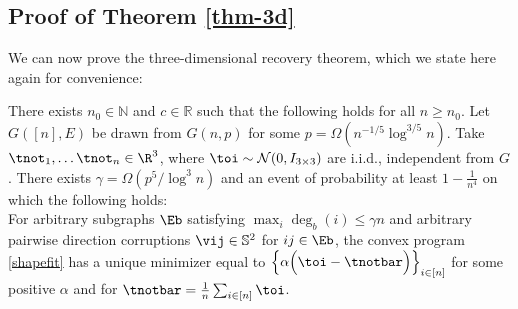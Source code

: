 \subsection{Proof of Theorem \ref{thm-3d}} \label{sec-proof-random-theorem-3d}

We can now prove the three-dimensional recovery theorem, which we state here again for convenience:
\setcounter{theorem}{1}
\begin{theorem}
There exists $n_0 \in \mathbb{N}$ and $c \in \mathbb{R}$ such that the following holds for all $n \ge n_0$.
Let $G([n],E)$ be drawn from $G(n,p)$ for some $p = \Omega( n^{-1/5} \log^{3/5} n)$. Take $ \tnot_1, \ldots \tnot_n  \in \R^3$, where $\toi \sim \mathcal{N}(0, I_{3 \times 3})$ are i.i.d., independent from $G$. 
There exists $\gamma = \Omega(p^5 / \log^3 n)$ and an event of probability at least  $1- \frac{1}{n^{4}}$ %
on which the following holds:\\[1em]
For arbitrary  subgraphs $\Eb$ satisfying $\max_i \deg_b(i) \leq \gamma n$ and arbitrary pairwise direction corruptions $\vij \in \mathbb{S}^2$ for $ij \in \Eb$,  the convex program \eqref{shapefit} has a unique minimizer equal to $\left \{\alpha \Bigl(\toi - \tnotbar \Bigr)\right\}_{i \in [n]}$ for some positive $\alpha$ and for $\tnotbar = \frac{1}{n}\sum_{i\in [n]} \toi$. 
\end{theorem}

